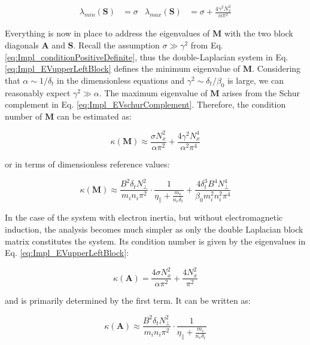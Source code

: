 \begin{align}
	\label{eq:Impl_EVschurComplement}
	\lambda_{min}(\textbf{S}) &= \sigma  & 
	\lambda_{max}(\textbf{S}) &= \sigma + \frac{4\gamma^2N_x^2}{\alpha\pi^2}
\end{align}

Everything is now in place to address the eigenvalues of $\mathbf{M}$ with the two block diagonals $\textbf{A}$ and $\textbf{S}$. Recall the assumption $\sigma \gg \gamma^2$ from Eq. \ref{eq:Impl_conditionPositiveDefinite}, thus the double-Laplacian system in Eq. \ref{eq:Impl_EVupperLeftBlock} defines the minimum eigenvalue of $\textbf{M}$. Considering that $\alpha \sim 1/\delta_t$ in the dimensionless equations and $\gamma^2 \sim \delta_t / \beta_0$ is large, we can reasonably expect $\gamma^2 \gg \alpha$. The maximum eigenvalue of $\textbf{M}$ arises from the Schur complement in Eq. \ref{eq:Impl_EVschurComplement}. Therefore, the condition number of $\textbf{M}$ can be estimated as:

\begin{equation}
	\label{eq:Impl_conditionNumberM}
	\kappa(\textbf{M}) \approx \frac{\sigma N_x^2}{\alpha\pi^2} + \frac{4\gamma^2N_x^4}{\alpha^2\pi^4}
\end{equation}

or in terms of dimensionless reference values:

\begin{equation}
	\label{eq:Impl_conditionNumberElectromagneticVorticitySystem}
	\boxed{
		\kappa(\textbf{M}) \approx \frac{ B^2\delta_t N_\perp^2}{m_in_i\pi^2} \cdot \frac{1}{\eta_\parallel + \frac{m_e}{n_e \delta_t}} + \frac{4\delta_t^3 B^4 N_\perp^4}{\beta_0m_i^2n_i^2\pi^4}
	}
\end{equation}

In the case of the system with electron inertia, but without electromagnetic induction, the analysis becomes much simpler as only the double Laplacian block matrix constitutes the system. Its condition number is given by the eigenvalues in Eq. \ref{eq:Impl_EVupperLeftBlock}:

\begin{equation}
	\label{eq:Impl_conditionNumberM_electronInertia}
	\kappa(\textbf{A}) = \frac{4\sigma N_x^2}{\alpha\pi^2} + \frac{4 N_x^2}{\pi^2}
\end{equation}

and is primarily determined by the first term. It can be written as:

\begin{equation}
	\label{eq:Impl_conditionNumberElectrnInertiaVorticitySystem}
	\boxed{
		\kappa(\textbf{A}) \approx \frac{ B^2\delta_t N_\perp^2}{m_in_i\pi^2} \cdot \frac{1}{\eta_\parallel + \frac{m_e}{n_e \delta_t}}
	}
\end{equation}

